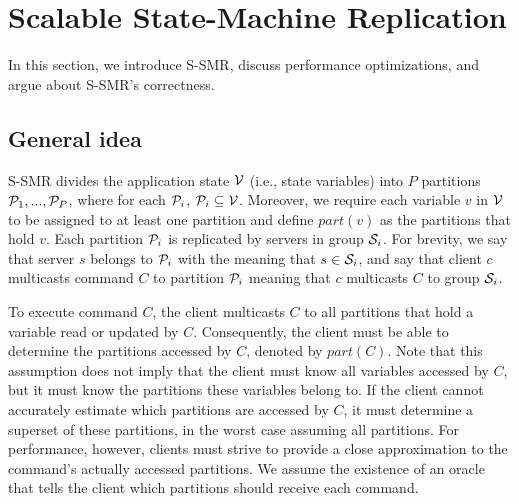 \section{Scalable State-Machine Replication}
\label{sec:scalablesmr}

In this section, we introduce S-SMR, discuss performance optimizations, and argue about S-SMR's correctness.


\subsection{General idea}
\label{sec:generalidea}

S-SMR divides the application state $\mathcal{V}$ (i.e., state variables) into $P$ partitions $\mathcal{P}_1, ..., \mathcal{P}_P$, where for each $\mathcal{P}_i$, $\mathcal{P}_i \subseteq \mathcal{V}$. 
Moreover, we require each variable $v$ in $\mathcal{V}$ to be assigned to at least one partition and define $part(v)$ as the partitions that hold $v$. 
Each partition $\mathcal{P}_i$ is replicated by servers in group $\mathcal{S}_i$.
For brevity, we say that server $s$ belongs to $\mathcal{P}_i$ with the meaning that $s \in \mathcal{S}_i$, and say that client $c$ multicasts command $C$ to partition $\mathcal{P}_i$ meaning that $c$ multicasts $C$ to group $\mathcal{S}_i$.

To execute command $C$, the client multicasts $C$ to all partitions that hold a variable read or updated by $C$.
Consequently, the client must be able to determine the partitions accessed by $C$, denoted by $part(C)$.
Note that this assumption does not imply that the client must know all variables accessed by $C$, but it must know the partitions these variables belong to.
If the client cannot accurately estimate which partitions are accessed by $C$, it must determine a superset of these partitions, in the worst case assuming all partitions.
For performance, however, clients must strive to provide a close approximation to the command's actually accessed partitions. We assume the existence of an oracle that tells the client which partitions should receive each command.

